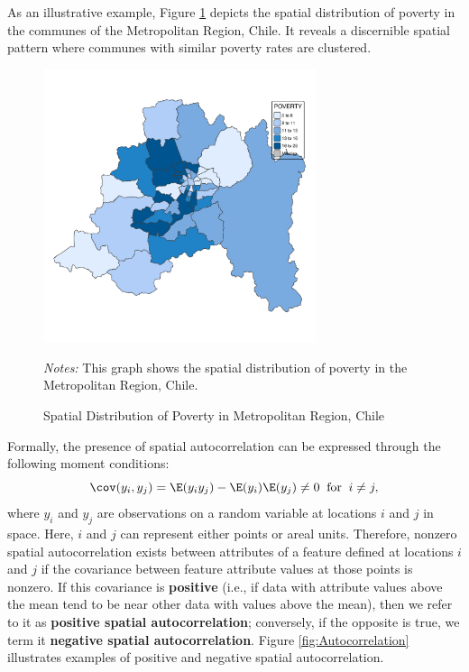 As an illustrative example, Figure \ref{fig:MR} depicts the spatial distribution of poverty in the communes of the Metropolitan Region, Chile. It reveals a discernible spatial pattern where communes with similar poverty rates are clustered.
\begin{figure}[ht]
  \caption{Spatial Distribution of Poverty in Metropolitan Region, Chile}
    \label{fig:MR}
    \centering
    	\begin{minipage}{.9\linewidth}
\begin{knitrout}
\color{fgcolor}

{\centering \includegraphics[width=8cm,height=8cm]{figure/MetroRegion-1} 

}


\end{knitrout}
\footnotesize
		\emph{Notes:} This graph shows the spatial distribution of poverty in the Metropolitan Region, Chile. 
	\end{minipage}	
\end{figure}

Formally, the presence of spatial autocorrelation can be expressed through the following moment conditions:
\begin{equation*}
  \cov(y_i, y_j) = \E(y_iy_j) - \E(y_i)\E(y_j) \neq 0 \;\; \text{for} \;\; i \neq j,
\end{equation*}
%
where $y_i$ and $y_j$ are observations on a random variable at locations $i$ and $j$ in space. Here, $i$ and $j$ can represent either points or areal units. Therefore, nonzero spatial autocorrelation exists between attributes of a feature defined at locations $i$ and $j$ if the covariance between feature attribute values at those points is nonzero. If this covariance is \textbf{positive} (i.e., if data with attribute values above the mean tend to be near other data with values above the mean), then we refer to it as \textbf{positive spatial autocorrelation}; conversely, if the opposite is true, we term it \textbf{negative spatial autocorrelation}. Figure \ref{fig:Autocorrelation} illustrates examples of positive and negative spatial autocorrelation.

